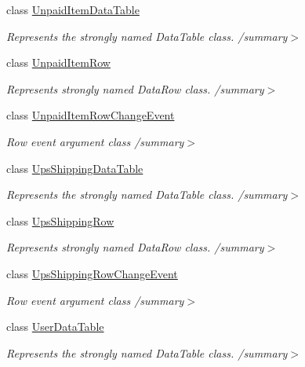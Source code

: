 \begin{DoxyCompactItemize}
class \hyperlink{class_products_1_1_data_1_1ds_sage_1_1_unpaid_item_data_table}{Unpaid\+Item\+Data\+Table}
\begin{DoxyCompactList}\small\item\em Represents the strongly named Data\+Table class. /summary$>$ \end{DoxyCompactList}\item 
class \hyperlink{class_products_1_1_data_1_1ds_sage_1_1_unpaid_item_row}{Unpaid\+Item\+Row}
\begin{DoxyCompactList}\small\item\em Represents strongly named Data\+Row class. /summary$>$ \end{DoxyCompactList}\item 
class \hyperlink{class_products_1_1_data_1_1ds_sage_1_1_unpaid_item_row_change_event}{Unpaid\+Item\+Row\+Change\+Event}
\begin{DoxyCompactList}\small\item\em Row event argument class /summary$>$ \end{DoxyCompactList}\item 
class \hyperlink{class_products_1_1_data_1_1ds_sage_1_1_ups_shipping_data_table}{Ups\+Shipping\+Data\+Table}
\begin{DoxyCompactList}\small\item\em Represents the strongly named Data\+Table class. /summary$>$ \end{DoxyCompactList}\item 
class \hyperlink{class_products_1_1_data_1_1ds_sage_1_1_ups_shipping_row}{Ups\+Shipping\+Row}
\begin{DoxyCompactList}\small\item\em Represents strongly named Data\+Row class. /summary$>$ \end{DoxyCompactList}\item 
class \hyperlink{class_products_1_1_data_1_1ds_sage_1_1_ups_shipping_row_change_event}{Ups\+Shipping\+Row\+Change\+Event}
\begin{DoxyCompactList}\small\item\em Row event argument class /summary$>$ \end{DoxyCompactList}\item 
class \hyperlink{class_products_1_1_data_1_1ds_sage_1_1_user_data_table}{User\+Data\+Table}
\begin{DoxyCompactList}\small\item\em Represents the strongly named Data\+Table class. /summary$>$ \end{DoxyCompactList}\item 

\end{DoxyCompactItemize}
